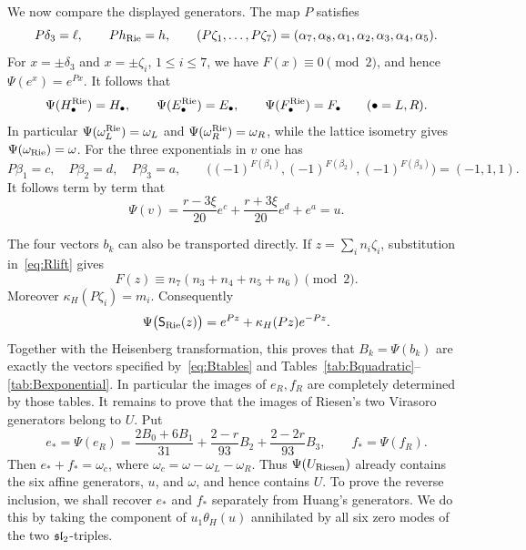 \documentclass[11pt,reqno]{amsart}
\theoremstyle{definition}\newtheorem{definition}[theorem]{Definition}
\theoremstyle{remark}\newtheorem{remark}[theorem]{Remark}
\numberwithin{equation}{section}
\begin{document}
We now compare the displayed generators. The map $P$ satisfies
\[
 P\delta_3=\ell,\qquad Ph_{\rm Rie}=h,\qquad
 (P\zeta_1,\ldots,P\zeta_7)
 =(\alpha_7,\alpha_8,\alpha_1,\alpha_2,\alpha_3,\alpha_4,\alpha_5).
\]
For $x=\pm\delta_3$ and $x=\pm\zeta_i$, $1\le i\le7$, we have $F(x)\equiv0\pmod2$, and hence $\Psi(e^x)=e^{Px}$. It follows that
\[
 \Psi(H_\bullet^{\rm Rie})=H_\bullet,\qquad
 \Psi(E_\bullet^{\rm Rie})=E_\bullet,\qquad
 \Psi(F_\bullet^{\rm Rie})=F_\bullet
 \qquad(\bullet=L,R).
\]
In particular $\Psi(\omega_L^{\rm Rie})=\omega_L$ and $\Psi(\omega_R^{\rm Rie})=\omega_R$, while the lattice isometry gives $\Psi(\omega_{\rm Rie})=\omega$. For the three exponentials in $v$ one has
\[
 P\beta_1=c,\quad P\beta_2=d,\quad P\beta_3=a,
 \qquad
 \bigl((-1)^{F(\beta_1)},(-1)^{F(\beta_2)},(-1)^{F(\beta_3)}\bigr)=(-1,1,1).
\]
It follows term by term that
\[
 \Psi(v)=\frac{r-3\xi}{20}e^c
          +\frac{r+3\xi}{20}e^d+e^a=u.
\]

The four vectors $b_k$ can also be transported directly. If $z=\sum_i n_i\zeta_i$, substitution in~\eqref{eq:Rlift} gives
\[
 F(z)\equiv n_7(n_3+n_4+n_5+n_6)\pmod2.
\]
Moreover $\kappa_H(P\zeta_i)=m_i$. Consequently
\[
 \Psi\bigl(\mathsf S_{\rm Rie}(z)\bigr)
 =e^{Pz}+\kappa_H(Pz)e^{-Pz}.
\]
Together with the Heisenberg transformation, this proves that $B_k=\Psi(b_k)$ are exactly the vectors specified by~\eqref{eq:Btables} and Tables~\ref{tab:Bquadratic}--\ref{tab:Bexponential}. In particular the images of $e_R,f_R$ are completely determined by those tables. It remains to prove that the images of Riesen's two Virasoro generators belong to $U$. Put
\[
 e_*=\Psi(e_R)
 =\frac{2B_0+6B_1}{31}
   +\frac{2-r}{93}B_2+\frac{2-2r}{93}B_3,
 \qquad f_*=\Psi(f_R).
\]
Then $e_*+f_*=\omega_c$, where $\omega_c=\omega-\omega_L-\omega_R$. Thus $\Psi(U_{\rm Riesen})$ already contains the six affine generators, $u$, and $\omega$, and hence contains $U$. To prove the reverse inclusion, we shall recover $e_*$ and $f_*$ separately from Huang's generators. We do this by taking the component of $u_1\theta_H(u)$ annihilated by all six zero modes of the two $\mathfrak{sl}_2$-triples.
\end{document}
